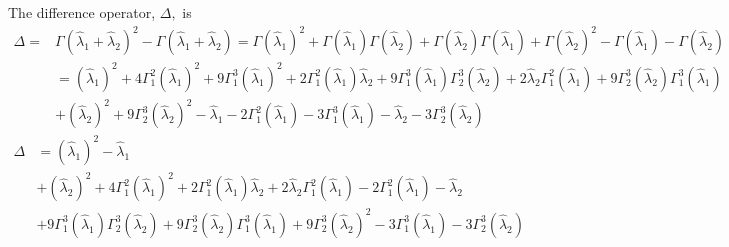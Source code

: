 \documentclass[aps,preprint]{revtex4}%
\begin{document}
The difference operator, $\Delta,$ is
\begin{align}
\Delta=  & \Gamma\left(  \hat{\lambda}_{1}+\hat{\lambda}_{2}\right)
^{2}-\Gamma\left(  \hat{\lambda}_{1}+\hat{\lambda}_{2}\right)  =\Gamma\left(
\hat{\lambda}_{1}\right)  ^{2}+\Gamma\left(  \hat{\lambda}_{1}\right)
\Gamma\left(  \hat{\lambda}_{2}\right)  +\Gamma\left(  \hat{\lambda}%
_{2}\right)  \Gamma\left(  \hat{\lambda}_{1}\right)  +\Gamma\left(
\hat{\lambda}_{2}\right)  ^{2}-\Gamma\left(  \hat{\lambda}_{1}\right)
-\Gamma\left(  \hat{\lambda}_{2}\right)  \nonumber\\
& =\left(  \hat{\lambda}_{1}\right)  ^{2}+4\Gamma_{1}^{2}\left(  \hat{\lambda
}_{1}\right)  ^{2}+9\Gamma_{1}^{3}\left(  \hat{\lambda}_{1}\right)
^{2}+2\Gamma_{1}^{2}\left(  \hat{\lambda}_{1}\right)  \hat{\lambda}%
_{2}+9\Gamma_{1}^{3}\left(  \hat{\lambda}_{1}\right)  \Gamma_{2}^{3}\left(
\hat{\lambda}_{2}\right)  +2\hat{\lambda}_{2}\Gamma_{1}^{2}\left(
\hat{\lambda}_{1}\right)  +9\Gamma_{2}^{3}\left(  \hat{\lambda}_{2}\right)
\Gamma_{1}^{3}\left(  \hat{\lambda}_{1}\right)  \nonumber\\
& +\left(  \hat{\lambda}_{2}\right)  ^{2}+9\Gamma_{2}^{3}\left(  \hat{\lambda
}_{2}\right)  ^{2}-\hat{\lambda}_{1}-2\Gamma_{1}^{2}\left(  \hat{\lambda}%
_{1}\right)  -3\Gamma_{1}^{3}\left(  \hat{\lambda}_{1}\right)  -\hat{\lambda
}_{2}-3\Gamma_{2}^{3}\left(  \hat{\lambda}_{2}\right)
\end{align}%
\begin{align}
\Delta & =\left(  \hat{\lambda}_{1}\right)  ^{2}-\hat{\lambda}_{1}\nonumber\\
& +\left(  \hat{\lambda}_{2}\right)  ^{2}+4\Gamma_{1}^{2}\left(  \hat{\lambda
}_{1}\right)  ^{2}+2\Gamma_{1}^{2}\left(  \hat{\lambda}_{1}\right)
\hat{\lambda}_{2}+2\hat{\lambda}_{2}\Gamma_{1}^{2}\left(  \hat{\lambda}%
_{1}\right)  -2\Gamma_{1}^{2}\left(  \hat{\lambda}_{1}\right)  -\hat{\lambda
}_{2}\nonumber\\
& +9\Gamma_{1}^{3}\left(  \hat{\lambda}_{1}\right)  \Gamma_{2}^{3}\left(
\hat{\lambda}_{2}\right)  +9\Gamma_{2}^{3}\left(  \hat{\lambda}_{2}\right)
\Gamma_{1}^{3}\left(  \hat{\lambda}_{1}\right)  +9\Gamma_{2}^{3}\left(
\hat{\lambda}_{2}\right)  ^{2}-3\Gamma_{1}^{3}\left(  \hat{\lambda}%
_{1}\right)  -3\Gamma_{2}^{3}\left(  \hat{\lambda}_{2}\right)
\end{align}


\bigskip%
\end{document}

